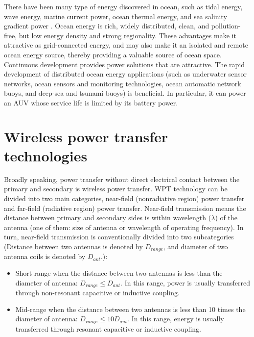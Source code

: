 There have been many type of energy discovered in ocean, such as tidal energy, wave energy, marine current power, ocean thermal energy, and sea salinity gradient power \cite{Capareda2019, Drew2009, Vlachogiannis2014, Zeng2020}.
Ocean energy is rich, widely distributed, clean, and pollution-free, but low energy density and strong regionality.
These advantages make it attractive as grid-connected energy, and may also make it an isolated and remote ocean energy source, thereby providing a valuable source of ocean space. Continuous development provides power solutions that are attractive. The rapid development of distributed ocean energy applications (such as underwater sensor networks, ocean sensors and monitoring technologies, ocean automatic network buoys, and deep-sea and tsunami buoys) is beneficial. In particular, it can power an AUV whose service life is limited by its battery power.


\section{Wireless power transfer technologies}

Broadly speaking, power transfer without direct electrical contact between the primary and secondary is wireless power transfer. WPT technology can be divided into two main categories, near-field (nonradiative region) power transfer and far-field (radiative region) power transfer.
Near-field transmission means the distance between primary and secondary sides is within wavelength ($\lambda$) of the antenna (one of them: size of antenna or wavelength of operating frequency). In turn, near-field transmission is conventionally divided into two subcategories \cite{Wikipedia2021, Chun} (Distance between two antennas is denoted by $D_{range}$, and diameter of two antenna coils is denoted by $D_{ant}$.):
\begin{itemize}
    \item  Short range when the distance between two antennas is less than the diameter of antenna: $D_{range} \leq D_{ant}$.
          In this range, power is usually transferred through non-resonant capacitive or inductive coupling.
    \item Mid-range when the distance between two antennas is less than 10 times the diameter of antenna:  $D_{range} \leq 10 D_{ant}$.
          In this range, energy is usually transferred through resonant capacitive or inductive coupling.
\end{itemize}

